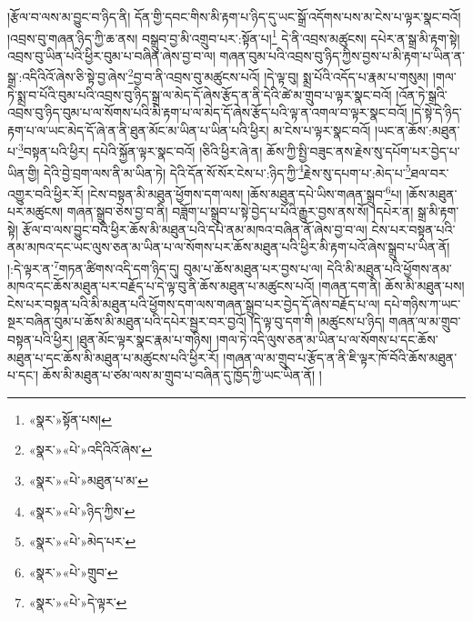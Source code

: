 །རྩོལ་བ་ལས་མ་བྱུང་བ་ཉིད་ནི། དོན་གྱི་དབང་གིས་མི་རྟག་པ་ཉིད་དུ་ཡང་སྒྲོ་འདོགས་པས་མ་ངེས་པ་ལྟར་སྣང་བའོ། །འབྲས་བུ་གཞན་ཉིད་ཀྱི་ཆ་ནས། བསྒྲུབ་བྱ་མི་འགྲུབ་པར་:སྟོན་པ།\footnote{«སྣར་»སྟོན་པས།} དེ་ནི་འབྲས་མཚུངས། དཔེར་ན་སྒྲ་མི་རྟག་སྟེ། འབྲས་བུ་ཡིན་པའི་ཕྱིར་བུམ་པ་བཞིན་ཞེས་བྱ་བ་ལ། གཞན་བུམ་པའི་འབྲས་བུ་ཉིད་ཀྱིས་བྱས་པ་མི་རྟག་པ་ཡིན་ན་སྒྲ་:འདིའིའོ་ཞེས་ཅི་སྟེ་བྱ་ཞེས་\footnote{«སྣར་»«པེ་»འདིའིའོ་ཞེས་}བྱ་བ་ནི་འབྲས་བུ་མཚུངས་པའོ། །དེ་ལྟ་བུ། སྨྲ་པོའི་འདོད་པ་རྣམ་པ་གསུམ། །གལ་ཏེ་སྨྲ་བ་པོའི་བུམ་པའི་འབྲས་བུ་ཉིད་སྒྲ་ལ་མེད་དོ་ཞེས་རྩོད་ན་ནི་དེའི་ཚེ་མ་གྲུབ་པ་ལྟར་སྣང་བའོ། །འོན་ཏེ་སྒྲའི་འབྲས་བུ་ཉིད་བུམ་པ་ལ་སོགས་པའི་མི་རྟག་པ་ལ་མེད་དོ་ཞེས་རྩོད་པའི་ལྟ་ན་འགལ་བ་ལྟར་སྣང་བའོ། །དེ་སྟེ་དེ་ཉིད་རྟག་པ་ལ་ཡང་མེད་དོ་ཞེ་ན་ནི་ཐུན་མོང་མ་ཡིན་པ་ཡིན་པའི་ཕྱིར། མ་ངེས་པ་ལྟར་སྣང་བའོ། །ཡང་ན་ཆོས་:མཐུན་པ་\footnote{«སྣར་»«པེ་»མཐུན་པ་མ་}བསྟན་པའི་ཕྱིར། དཔེའི་སྐྱོན་ལྟར་སྣང་བའོ། །ཅིའི་ཕྱིར་ཞེ་ན། ཆོས་ཀྱི་སྤྱི་བཟུང་ནས་རྗེས་སུ་དཔོག་པར་བྱེད་པ་ཡིན་གྱི། དེའི་བྱེ་བྲག་ལས་ནི་མ་ཡིན་ཏེ། དེའི་དོན་སོ་སོར་ངེས་པ་:ཉིད་ཀྱི་\footnote{«སྣར་»«པེ་»ཉིད་ཀྱིས་}རྗེས་སུ་དཔག་པ་:མེད་པ་\footnote{«སྣར་»«པེ་»མེད་པར་}ཐལ་བར་འགྱུར་བའི་ཕྱིར་རོ། །ངེས་བསྟན་མི་མཐུན་ཕྱོགས་དག་ལས། །ཆོས་མཐུན་དཔེ་ཡིས་གཞན་སྒྲུབ་\footnote{«སྣར་»«པེ་»གྲུབ་}པ། །ཆོས་མཐུན་པར་མཚུངས། གཞན་སྒྲུབ་ཅེས་བྱ་བ་ནི། བཟློག་པ་སྒྲུབ་པ་སྟེ་བྱེད་པ་པོའི་རྒྱུར་བྱས་ནས་སོ། །དཔེར་ན། སྒྲ་མི་རྟག་སྟེ། རྩོལ་བ་ལས་བྱུང་བའི་ཕྱིར་ཆོས་མི་མཐུན་པའི་དཔེ་ནམ་མཁའ་བཞིན་ནོ་ཞེས་བྱ་བ་ལ། ངེས་པར་བསྟན་པའི་ནམ་མཁའ་དང་ཡང་ལུས་ཅན་མ་ཡིན་པ་ལ་སོགས་པར་ཆོས་མཐུན་པའི་ཕྱིར་མི་རྟག་པའོ་ཞེས་སྒྲུབ་པ་ཡིན་ནོ། །:དེ་ལྟར་ན་\footnote{«སྣར་»«པེ་»དེ་ལྟར་}གཏན་ཚིགས་འདི་དག་ཉིད་དུ། བུམ་པ་ཆོས་མཐུན་པར་བྱས་པ་ལ། དེའི་མི་མཐུན་པའི་ཕྱོགས་ནམ་མཁའ་དང་ཆོས་མཐུན་པར་བརྗོད་པ་དེ་ལྟ་བུ་ནི་ཆོས་མཐུན་པ་མཚུངས་པའོ། །གཞན་དག་ནི། ཆོས་མི་མཐུན་པས། ངེས་པར་བསྟན་པའི་མི་མཐུན་པའི་ཕྱོགས་དག་ལས་གཞན་སྒྲུབ་པར་བྱེད་དོ་ཞེས་བརྗོད་པ་ལ། དཔེ་གཉིས་ཀ་ཡང་སྔར་བཞིན་བུམ་པ་ཆོས་མི་མཐུན་པའི་དཔེར་སྦྱར་བར་བྱའོ། །དེ་ལྟ་བུ་དག་གི །མཚུངས་པ་ཉིད། གཞན་ལ་མ་གྲུབ་བསྟན་པའི་ཕྱིར། །ཐུན་མོང་ལྟར་སྣང་རྣམ་པ་གཉིས། །གལ་ཏེ་འདི་ལུས་ཅན་མ་ཡིན་པ་ལ་སོགས་པ་དང་ཆོས་མཐུན་པ་དང་ཆོས་མི་མཐུན་པ་མཚུངས་པའི་ཕྱིར་རོ། །གཞན་ལ་མ་གྲུབ་པ་རྩོད་ན་ནི་ཇི་ལྟར་ཁོ་བོའི་ཆོས་མཐུན་པ་དང་། ཆོས་མི་མཐུན་པ་ཙམ་ལས་མ་གྲུབ་པ་བཞིན་དུ་ཁྱོད་ཀྱི་ཡང་ཡིན་ནོ། །
